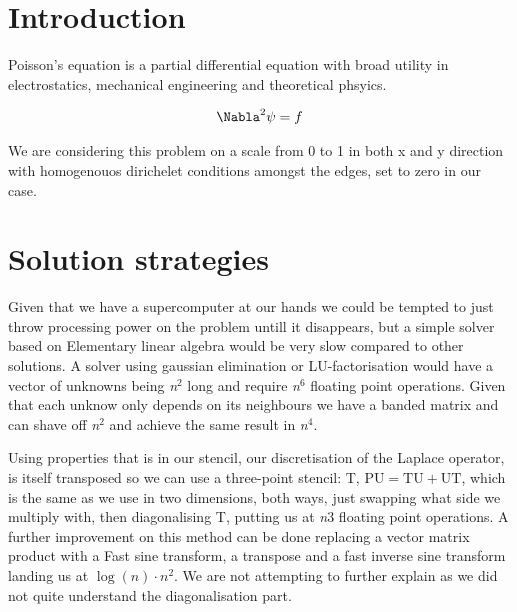 \section{Introduction}
Poisson's equation is a partial differential equation with broad utility in
electrostatics, mechanical engineering and theoretical phsyics.\cite{wiki}

\begin{align}
	\Nabla^2 \psi &= f \\
\end{align}

We are considering this problem on a scale from 0 to 1 in both x and y
direction with homogenouos dirichelet conditions amongst the edges, set to zero
in our case. 

\section{Solution strategies}
Given that we have a supercomputer at our hands we could be tempted to just
throw processing power on the problem untill it disappears, but a simple solver
based on Elementary linear algebra would be very slow compared to other
solutions. A solver using gaussian elimination or LU-factorisation would have a
vector of unknowns being \emph{n}$^2$ long and require \emph{n}$^6$ floating
point operations. Given that each unknow only depends on its neighbours we have
a banded matrix and can shave off \emph{n}$^2$ and achieve the same result in
\emph{n}$^4$. 

Using properties that is in our stencil, our discretisation of the Laplace
operator, is itself transposed so we can use a three-point stencil: T, $\mathrm{PU}=\mathrm{TU+UT}$, which is
the same as we use in two dimensions, both ways, just swapping what side we
multiply with, then diagonalising T, putting us at \emph{n}$3$ floating point
operations. A further improvement on this method can be done replacing a vector
matrix product with a Fast sine transform, a transpose and a fast inverse sine
transform landing us at $\log(n)\cdot n^2$. We are not attempting to further
explain as we did not quite understand the diagonalisation part. 
	

